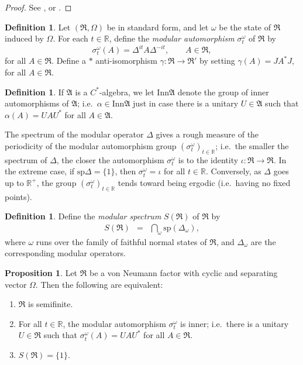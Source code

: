 \documentclass[11pt]{article}
\theoremstyle{definition}
\newtheorem{prop}[thm]{Proposition}
\theoremstyle{definition}
\newtheorem{defn}[thm]{Definition}
\theoremstyle{remark}
\def\7#1{{\mathbb #1}}
\def\al#1{{\mathfrak #1}}
\def\a{\alpha} \def\b{\beta} \def\g{\gamma} \def\d{\delta}
\def\om{\omega} \def\Om{\Omega} \def\dd{\partial} \def\D{\Delta}
\newcommand{\Inn}{\mathrm{Inn}}
\begin{document}
\begin{proof} See \cite[Thm.\ 9.2.9]{kr}, or \cite[Thm.\
  2.3.3]{sunder}.
\end{proof}

\begin{defn} Let $(\al R,\Om )$ be in standard form, and let $\om$ be
  the state of $\al R$ induced by $\Om$.  For each $t\in \7R$, define
  the \emph{modular automorphism} $\sigma ^{\om}_t$ of $\al R$ by
$$\sigma ^{\om}_t(A)=\D ^{it}A\D ^{-it} ,\qquad A \in  \al R ,$$
for all $A\in \al R$.  Define a $*$ anti-isomorphism
$\g :\al R\to \al R'$ by setting $\g (A)=JA^*J$, for
all $A\in \al R$.  \end{defn}

\begin{defn} If $\al A$ is a $C^*$-algebra, we let $\Inn \al A$ denote
  the group of inner automorphisms of $\al A$; i.e.\ $\a \in \Inn \al
  A$ just in case there is a unitary $U\in \al A$ such that $\a
  (A)=UAU^*$ for all $A\in \al A$.  \end{defn}

The spectrum of the modular operator $\D$ gives a rough
measure of the periodicity of the modular automorphism
group $( \sigma ^{\om}_t)_{t\in \7R}$; i.e.\ the
smaller the spectrum of $\D$, the closer the
automorphism $\sigma ^{\om}_t$ is to the identity
$\iota :\al R\to \al R$.  In the extreme case, if
$\mathrm{sp}\D=\{ 1\}$, then $\sigma ^{\om}_t=\iota$
for all $t\in \7R$.  Conversely, as $\D$ goes up to
$\7R ^+$, the group $(\sigma _t^{\om})_{t\in \7R}$
tends toward being ergodic (i.e.\ having no fixed
points).

\begin{defn} Define the \emph{modular spectrum} $S(\al
  R)$ of $\al R$ by \begin{eqnarray*} S(\al R) &=&
    \bigcap _{\om }\mathrm{sp} (\D _{\om }
    ),\end{eqnarray*} where $\om$ runs over the family
  of faithful normal states of $\al R$, and $\D _\om$
  are the corresponding modular operators.
\end{defn}


\begin{prop} Let $\al R$ be a von Neumann factor with cyclic and
  separating vector $\Om $.  Then the following are equivalent:
  \begin{enumerate}
  \item $\al R$ is semifinite.
\item For all $t\in \7R$, the modular automorphism $\sigma ^{\om}_t$
  is inner; i.e.\ there is a unitary $U\in \al R$ such that $\sigma
  ^{\om}_t(A)=UAU^*$ for all $A\in \al R$.
\item $S(\al R)=\{ 1\}$. \end{enumerate}
\end{prop}
\end{document}
